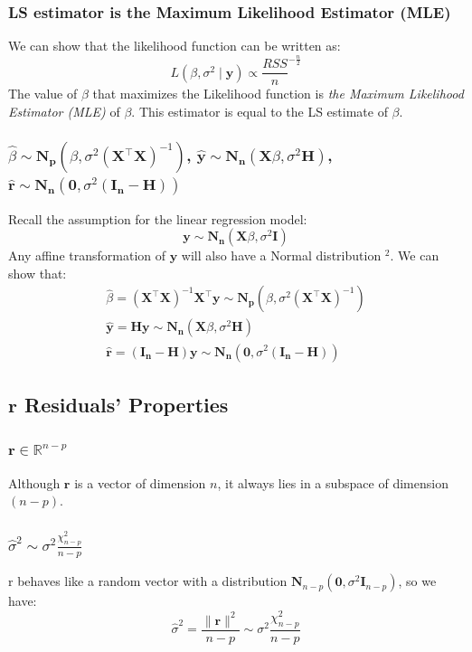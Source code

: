 \documentclass[11pt,a4paper]{article}
\begin{document}
\subsubsection{LS estimator is the Maximum Likelihood Estimator (MLE)}
We can show that the likelihood function can be written as:
$$
L\left(\beta, \sigma^{2} \mid \mathbf{y}\right) \propto \frac{R S S}{n}^{-\frac{n}{2}}
$$
The value of $\beta$ that maximizes the Likelihood function is \textit{the Maximum Likelihood Estimator (MLE)} of $\beta$. This estimator is equal to the LS estimate of $\beta$.
\subsubsection{$\hat{\beta}\sim \mathbf{N}_{\mathbf{p}}\left(\beta, \sigma^{2}\left(\mathbf{X}^{\top} \mathbf{X}\right)^{-1}\right)$, $\hat{\mathbf{y}}\sim\mathbf{N}_{\mathbf{n}}\left(\mathbf{X} \beta, \sigma^{2} \mathbf{H}\right)$, $\hat{\mathbf{r}}\sim \mathbf{N}_{\mathbf{n}}\left(\mathbf{0}, \sigma^{2}\left(\mathbf{I}_{\mathbf{n}}-\mathbf{H}\right)\right)$}
Recall the assumption for the linear regression model:
$$
\mathbf{y} \sim \mathbf{N}_{\mathbf{n}}\left(\mathbf{X} \beta, \sigma^{2} \mathbf{I}\right)
$$
Any affine transformation of $\mathbf{y}$ will also have a Normal distribution $^{2}$.
We can show that:
$$
\begin{gathered}
\hat{\beta}=\left(\mathbf{X}^{\top} \mathbf{X}\right)^{-1} \mathbf{X}^{\top} \mathbf{y} \sim \mathbf{N}_{\mathbf{p}}\left(\beta, \sigma^{2}\left(\mathbf{X}^{\top} \mathbf{X}\right)^{-1}\right) \\
\hat{\mathbf{y}}=\mathbf{H} \mathbf{y} \sim \mathbf{N}_{\mathbf{n}}\left(\mathbf{X} \beta, \sigma^{2} \mathbf{H}\right) \\
\hat{\mathbf{r}}=\left(\mathbf{I}_{\mathbf{n}}-\mathbf{H}\right) \mathbf{y} \sim \mathbf{N}_{\mathbf{n}}\left(\mathbf{0}, \sigma^{2}\left(\mathbf{I}_{\mathbf{n}}-\mathbf{H}\right)\right)
\end{gathered}
$$
\subsection{$\mathbf{r}$ Residuals’ Properties}
\subsubsection{$\mathbf{r}\in \mathbb{R}^{n-p}$}
Although $\mathbf{r}$ is a vector of dimension $n$, it always lies in a subspace of dimension $(n − p)$.
\subsubsection{$\hat{\sigma}^{2}\sim\sigma^{2} \frac{\chi_{n-p}^{2}}{n-p}$}
r behaves like a random vector with a distribution $\mathbf{N}_{n-p}\left(\mathbf{0}, \sigma^{2} \mathbf{I}_{n-p}\right)$, so we have:
$$
\hat{\sigma}^{2}=\frac{\|\mathbf{r}\|^{2}}{n-p} \sim \sigma^{2} \frac{\chi_{n-p}^{2}}{n-p}
$$
\end{document}
